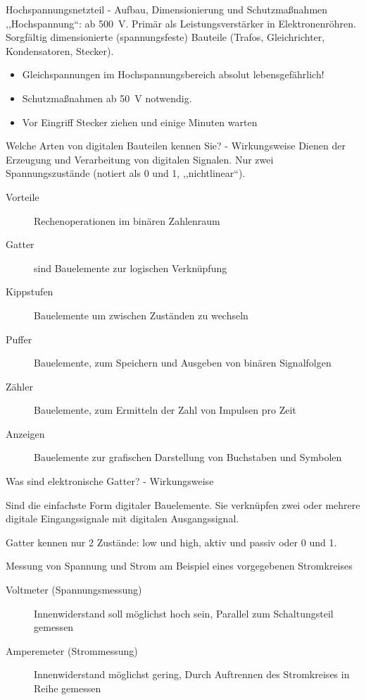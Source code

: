 \documentclass[avery5371,grid,frame,a4paper]{flashcards}
\newcommand{\card}[3]{
  \begin{flashcard}[{\chap} -- #1]{#2}#3\end{flashcard}
}
\begin{document}
\card{28}{Hochspannungsnetzteil - Aufbau, Dimensionierung und Schutzmaßnahmen}{
  ,,Hochspannung``: ab \SI{500}{\volt}.
  Primär als Leistungsverstärker in Elektronenröhren.
  Sorgfältig dimensionierte (spannungsfeste) Bauteile (Trafos, Gleichrichter, Kondensatoren, Stecker).

  \begin{itemize}
    \item Gleichspannungen im Hochspannungsbereich absolut lebensgefährlich!
    \item Schutzmaßnahmen ab \SI{50}{\volt} notwendig.
    \item Vor Eingriff Stecker ziehen und einige Minuten warten
  \end{itemize}
}
\card{29}{Welche Arten von digitalen Bauteilen kennen Sie? - Wirkungsweise}{
  \footnotesize
  Dienen der Erzeugung und Verarbeitung von digitalen Signalen.
  Nur zwei Spannungszustände (notiert als 0 und 1, ,,nichtlinear``).

  \begin{description}
    \item[Vorteile] Rechenoperationen im binären Zahlenraum
    \item[Gatter] sind Bauelemente zur logischen Verknüpfung
    \item[Kippstufen] Bauelemente um zwischen Zuständen zu wechseln
    \item[Puffer] Bauelemente, zum Speichern und Ausgeben von binären Signalfolgen
    \item[Zähler] Bauelemente, zum Ermitteln der Zahl von Impulsen pro Zeit
    \item[Anzeigen] Bauelemente zur grafischen Darstellung von Buchstaben und Symbolen
  \end{description}
}
\card{30}{Was sind elektronische Gatter? - Wirkungsweise}{
  \item
  Sind die einfachste Form digitaler Bauelemente.
  Sie verknüpfen zwei oder mehrere digitale Eingangssignale mit digitalen Ausgangssignal.

  \item
  Gatter kennen nur 2 Zustände: low und high, aktiv und passiv oder 0 und 1.
}
\card{31}{Messung von Spannung und Strom am Beispiel eines vorgegebenen Stromkreises}{
  \begin{description}
    \item[Voltmeter (Spannungsmessung)]
      Innenwiderstand soll möglichst hoch sein,
      Parallel zum Schaltungsteil gemessen
    \item[Amperemeter (Strommessung)]
      Innenwiderstand möglichst gering,
      Durch Auftrennen des Stromkreises in Reihe gemessen
  \end{description}
}
\end{document}
